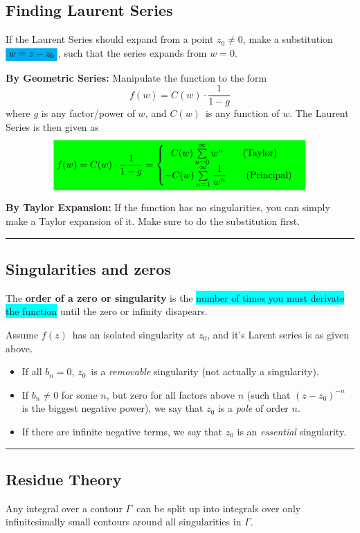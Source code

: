 \documentclass[10pt,a4paper]{article}
\newcommand{\holine}{\rule{286pt}{1pt}}
\newcommand{\gr}[1]{\colorbox{green}{$\displaystyle #1$}}
\newcommand{\bl}[1]{\colorbox{cyan}{$\displaystyle #1$}}
\newcommand{\bll}{\colorbox{cyan}}
\begin{document}
\begin{multicols}{2}
\subsection*{Finding Laurent Series}
If the Laurent Series should expand from a point $z_0 \neq 0$, make a substitution $\bl{w = z - z_0}$, such that the series expands from $w=0$.

\textbf{By Geometric Series:} Manipulate the function to the form
\[
    f(w) = C(w)\cdot \frac{1}{1-g}
\]
    where $g$ is any factor/power of $w$, and $C(w)$ is any function of $w$.
    The Laurent Series is then given as
\[
\gr{
    f(w) = C(w)\cdot \frac{1}{1-g} = \begin{cases} \ \ C(w)\sum\limits_{n=0}^\infty w^n \quad\quad \text{(Taylor)} \\ -C(w)\sum\limits_{n=1}^\infty\dfrac{1}{w^n} \quad\quad \text{(Principal)} \end{cases}
}
\]

\textbf{By Taylor Expansion:} If the function has no singularities, you can simply make a Taylor expansion of it. Make sure to do the substitution first.


\holine
\subsection*{Singularities and zeros}
The \textbf{order of a zero or singularity} is the \bll{number of times you must derivate the function} until the zero or infinity disapears.

Assume $f(z)$ has an isolated singularity at $z_0$, and it's Larent series is as given above.
\begin{itemize}
    \item If all $b_n = 0$, $z_0$ is a \textit{removable} singularity (not actually a singularity).
    \item If $b_n \neq 0$ for some $n$, but zero for all factors above $n$ (such that $(z-z_0)^{-n}$ is the biggest negative power), we say that $z_0$ is a \textit{pole} of order $n$.
    \item If there are infinite negative terms, we say that $z_0$ is an \textit{essential} singularity.
\end{itemize}


\holine
\subsection*{Residue Theory}
Any integral over a contour $\Gamma$ can be split up into integrals over only infinitesimally small contours around all singularities in $\Gamma$.


\end{multicols}
\end{document}
